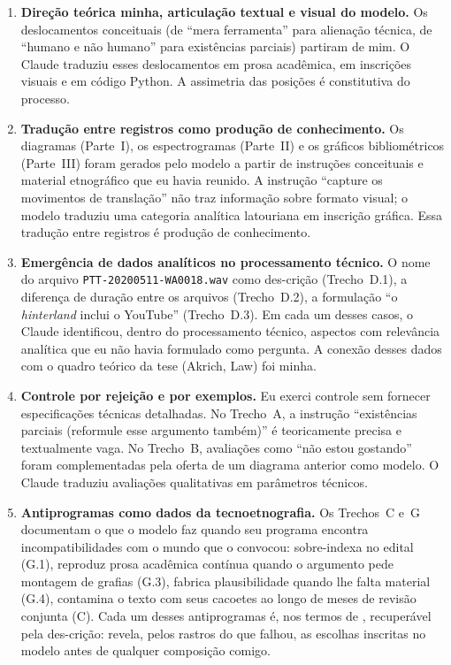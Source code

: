 \begin{enumerate}

\item \textbf{Direção teórica minha, articulação textual e visual do modelo.} Os deslocamentos conceituais (de ``mera ferramenta'' para alienação técnica, de ``humano e não humano'' para existências parciais) partiram de mim. O Claude traduziu esses deslocamentos em prosa acadêmica, em inscrições visuais e em código Python. A assimetria das posições é constitutiva do processo.

\item \textbf{Tradução entre registros como produção de conhecimento.} Os diagramas (Parte~I), os espectrogramas (Parte~II) e os gráficos bibliométricos (Parte~III) foram gerados pelo modelo a partir de instruções conceituais e material etnográfico que eu havia reunido. A instrução ``capture os movimentos de translação'' não traz informação sobre formato visual; o modelo traduziu uma categoria analítica latouriana em inscrição gráfica. Essa tradução entre registros é produção de conhecimento.

\item \textbf{Emergência de dados analíticos no processamento técnico.} O nome do arquivo \texttt{PTT-20200511-WA0018.wav} como des-crição (Trecho~D.1), a diferença de duração entre os arquivos (Trecho~D.2), a formulação ``o \textit{hinterland} inclui o YouTube'' (Trecho~D.3). Em cada um desses casos, o Claude identificou, dentro do processamento técnico, aspectos com relevância analítica que eu não havia formulado como pergunta. A conexão desses dados com o quadro teórico da tese (Akrich, Law) foi minha.

\item \textbf{Controle por rejeição e por exemplos.} Eu exerci controle sem fornecer especificações técnicas detalhadas. No Trecho~A, a instrução ``existências parciais (reformule esse argumento também)'' é teoricamente precisa e textualmente vaga. No Trecho~B, avaliações como ``não estou gostando'' foram complementadas pela oferta de um diagrama anterior como modelo. O Claude traduziu avaliações qualitativas em parâmetros técnicos.

\item \textbf{Antiprogramas como dados da tecnoetnografia.} Os Trechos~C e~G documentam o que o modelo faz quando seu programa encontra incompatibilidades com o mundo que o convocou: sobre-indexa no edital (G.1), reproduz prosa acadêmica contínua quando o argumento pede montagem de grafias (G.3), fabrica plausibilidade quando lhe falta material (G.4), contamina o texto com seus cacoetes ao longo de meses de revisão conjunta (C). Cada um desses antiprogramas é, nos termos de \textcite{Akrich1992Description}, recuperável pela des-crição: revela, pelos rastros do que falhou, as escolhas inscritas no modelo antes de qualquer composição comigo.


\end{enumerate}
